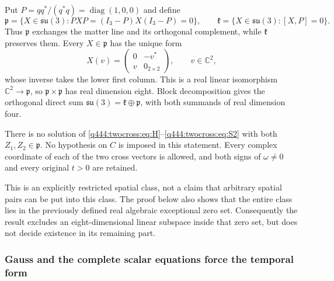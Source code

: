 Put $P=qq^*/(q^*q)=\operatorname{diag}(1,0,0)$ and define
\[
\mathfrak p=\{X\in\mathfrak{su}(3):PXP=(I_3-P)X(I_3-P)=0\},\qquad
\mathfrak k=\{X\in\mathfrak{su}(3):[X,P]=0\}.
\]
Thus $\mathfrak p$ exchanges the matter line and its orthogonal complement, while
$\mathfrak k$ preserves them. Every $X\in\mathfrak p$ has the unique form
\[
X(v)=\begin{pmatrix}0&-v^*\\v&0_{2\times2}\end{pmatrix},
\qquad v\in\mathbb C^2,
\]
whose inverse takes the lower first column. This is a real linear
isomorphism $\mathbb C^2\to\mathfrak p$, so $\mathfrak p\times\mathfrak p$ has real dimension eight.
Block decomposition gives the orthogonal direct sum $\mathfrak{su}(3)=\mathfrak k\oplus\mathfrak p$,
with both summands of real dimension four.

\begin{theorem}\label{q444:twocross:thm:exclusion}
There is no solution of \eqref{q444:twocross:eq:H}--\eqref{q444:twocross:eq:S2} with both
$Z_1,Z_2\in\mathfrak p$. No hypothesis on $C$ is imposed in this statement.
Every complex coordinate of each of the two cross vectors is allowed,
and both signs of $\omega\ne0$ and every original $t>0$ are retained.
\end{theorem}

This is an explicitly restricted spatial class, not a claim that arbitrary
spatial pairs can be put into this class. The proof below also shows that
the entire class lies in the previously defined real algebraic exceptional
zero set. Consequently the result excludes an eight-dimensional linear
subspace inside that zero set, but does not decide existence in its
remaining part.

\subsubsection{Gauss and the complete scalar equations force the temporal form}
\label{q444:twocross:temporal-form}

